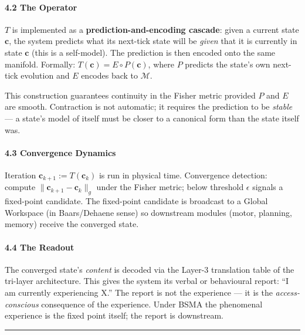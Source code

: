 \documentclass[
  11pt,
  a4paper,
]{article}
\begin{document}
\paragraph{4.2 The Operator}\label{the-operator}

\(T\) is implemented as a \textbf{prediction-and-encoding cascade}:
given a current state \(\mathbf{c}\), the system predicts what its
next-tick state will be \emph{given} that it is currently in state
\(\mathbf{c}\) (this is a self-model). The prediction is then encoded
onto the same manifold. Formally:
\(T(\mathbf{c}) = E \circ P(\mathbf{c})\), where \(P\) predicts the
state's own next-tick evolution and \(E\) encodes back to
\(\mathcal{M}\).

This construction guarantees continuity in the Fisher metric provided
\(P\) and \(E\) are smooth. Contraction is not automatic; it requires
the prediction to be \emph{stable} --- a state's model of itself must be
closer to a canonical form than the state itself was.

\paragraph{4.3 Convergence Dynamics}\label{convergence-dynamics}

Iteration \(\mathbf{c}_{k+1} := T(\mathbf{c}_k)\) is run in physical
time. Convergence detection: compute
\(\|\mathbf{c}_{k+1} - \mathbf{c}_k\|_g\) under the Fisher metric; below
threshold \(\epsilon\) signals a fixed-point candidate. The fixed-point
candidate is broadcast to a Global Workspace (in Baars/Dehaene sense) so
downstream modules (motor, planning, memory) receive the converged
state.

\paragraph{4.4 The Readout}\label{the-readout}

The converged state's \emph{content} is decoded via the Layer-3
translation table of the tri-layer architecture. This gives the system
its verbal or behavioural report: ``I am currently experiencing X.'' The
report is not the experience --- it is the \emph{access-conscious}
consequence of the experience. Under BSMA the phenomenal experience is
the fixed point itself; the report is downstream.

\begin{center}\rule{0.5\linewidth}{0.5pt}\end{center}
\end{document}
